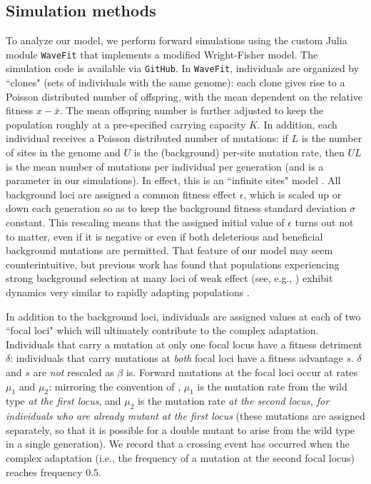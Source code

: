 \documentclass[10pt,twocolumn,twoside]{gsajnl}
\begin{document}
\begin{spacing}{1.5}
\section{Simulation methods}

To analyze our model, we perform forward simulations using the custom Julia module \texttt{WaveFit} that implements a modified Wright-Fisher model.
The simulation code is available via \texttt{GitHub}.
In \texttt{WaveFit}, individuals are organized by ``clones" (sets of individuals with the same genome): each clone gives rise to a Poisson distributed number of offspring, with the mean dependent on the relative fitness $x-\bar{x}$.
The mean offspring number is further adjusted to keep the population roughly at a pre-specified carrying capacity $K$.
In addition, each individual receives a Poisson distributed number of mutations: if $L$ is the number of sites in the genome and $U$ is the (background) per-site mutation rate, then $UL$ is the mean number of mutations per individual per generation (and is a parameter in our simulations).
In effect, this is an ``infinite sites" model \citep{Kimura:1971,Watterson:1975}.
All background loci are assigned a common fitness effect $\epsilon$, which is scaled up or down each generation so as to keep the background fitness standard deviation $\sigma$ constant.
This rescaling means that the assigned initial value of $\epsilon$ turns out not to matter, even if it is negative or even if both deleterious and beneficial background mutations are permitted.
That feature of our model may seem counterintuitive, but previous work has found that populations experiencing strong background selection at many loci of weak effect (see, e.g., \citet{cvijovic_2015}) exhibit dynamics very similar to rapidly adapting populations \citep{desai_fisher_2007, neher_shraiman_2011}.

In addition to the background loci, individuals are assigned values at each of two ``focal loci" which will ultimately contribute to the complex adaptation.
Individuals that carry a mutation at only one focal locus have a fitness detriment $\delta$: individuals that carry mutations at \emph{both} focal loci have a fitness advantage $s$.
$\delta$ and $s$ are \emph{not} rescaled as $\beta$ is.
Forward mutations at the focal loci occur at rates $\mu_1$ and $\mu_2$: mirroring the convention of \citet{weissman_2009}, $\mu_1$ is the mutation rate from the wild type \emph{at the first locus}, and $\mu_2$ is the mutation rate \emph{at the second locus, for individuals who are already mutant at the first locus} (these mutations are assigned separately, so that it is possible for a double mutant to arise from the wild type in a single generation).
We record that a crossing event has occurred when the complex adaptation (i.e., the frequency of a mutation at the second focal locus) reaches frequency $0.5$.


\end{spacing}
\end{document}
